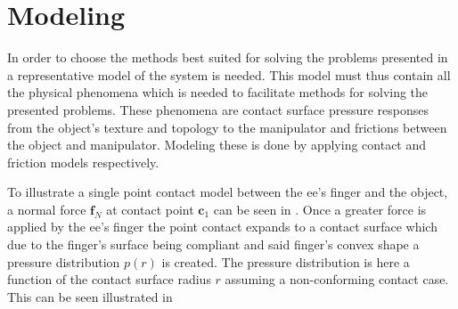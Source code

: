 
\chapter{Modeling} \label{ch:modeling}

In order to choose the methods best suited for solving the problems presented in  a representative model of the system is needed. This model must thus contain all the physical phenomena which is needed to facilitate methods for solving the presented problems. These phenomena are contact surface pressure responses from the object's texture and topology to the manipulator and frictions between the object and manipulator. Modeling these is done by applying contact and friction models respectively. \medskip

To illustrate a single point contact model between the \gls{ee}'s finger and the object, a normal force $\mathbf{f}_N$ at contact point $\mathbf{c}_1$ can be seen in . Once a greater force is applied by the \gls{ee}'s finger the point contact expands to a contact surface which due to the finger's surface being compliant and said finger's convex shape a pressure distribution $p(r)$ is created. The pressure distribution is here a function of the contact surface radius $r$ assuming a non-conforming contact case. This can be seen illustrated in 

